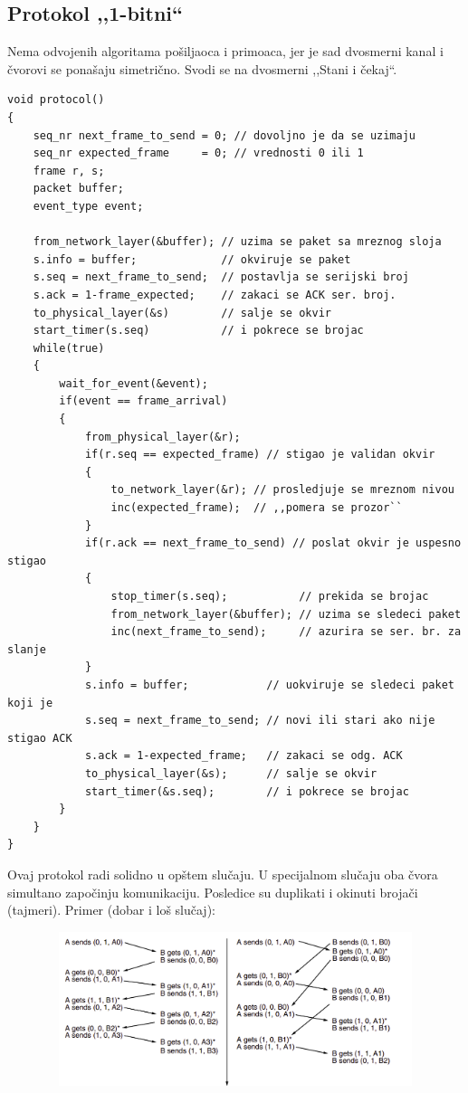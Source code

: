 \documentclass[a4paper]{article}
\begin{document}
    \subsection{Protokol ,,1-bitni``}
        Nema odvojenih algoritama pošiljaoca i primoaca, jer je sad dvosmerni kanal i čvorovi
        se ponašaju simetrično. Svodi se na dvosmerni ,,Stani i čekaj``. 
\begin{lstlisting}
void protocol()
{
    seq_nr next_frame_to_send = 0; // dovoljno je da se uzimaju
    seq_nr expected_frame     = 0; // vrednosti 0 ili 1
    frame r, s; 
    packet buffer;
    event_type event;

    from_network_layer(&buffer); // uzima se paket sa mreznog sloja
    s.info = buffer;             // okviruje se paket
    s.seq = next_frame_to_send;  // postavlja se serijski broj
    s.ack = 1-frame_expected;    // zakaci se ACK ser. broj.
    to_physical_layer(&s)        // salje se okvir
    start_timer(s.seq)           // i pokrece se brojac
    while(true)
    {
        wait_for_event(&event);
        if(event == frame_arrival)
        {  
            from_physical_layer(&r);
            if(r.seq == expected_frame) // stigao je validan okvir
            {
                to_network_layer(&r); // prosledjuje se mreznom nivou
                inc(expected_frame);  // ,,pomera se prozor``
            }
            if(r.ack == next_frame_to_send) // poslat okvir je uspesno stigao
            {
                stop_timer(s.seq);           // prekida se brojac
                from_network_layer(&buffer); // uzima se sledeci paket
                inc(next_frame_to_send);     // azurira se ser. br. za slanje
            }
            s.info = buffer;            // uokviruje se sledeci paket koji je
            s.seq = next_frame_to_send; // novi ili stari ako nije stigao ACK
            s.ack = 1-expected_frame;   // zakaci se odg. ACK
            to_physical_layer(&s);      // salje se okvir
            start_timer(&s.seq);        // i pokrece se brojac
        }
    }
}\end{lstlisting}
    \newpage
    Ovaj protokol radi solidno u opštem slučaju. U specijalnom slučaju oba čvora simultano
    započinju komunikaciju. Posledice su duplikati i okinuti brojači (tajmeri). Primer (dobar i loš
    slučaj):
    \begin{figure}[H]
        \begin{center}
            \includegraphics[width=120mm,height=45mm]{Slike/prozori2.png}
        \end{center}
    \end{figure}
\end{document}
